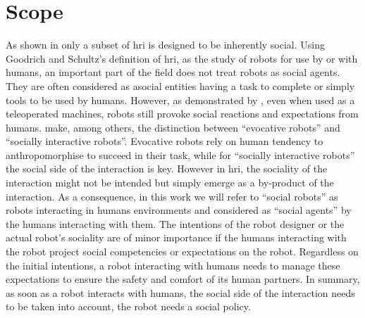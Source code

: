 
%
%
%

\section{Scope}\label{sec:intro_scope}

As shown in \cite{goodrich2007human} only a subset of \gls{hri} is designed to be inherently social. Using Goodrich and Schultz's definition of \gls{hri}, as the study of robots for use by or with humans, an important part of the field does not treat robots as social agents. They are often considered as asocial entities having a task to complete or simply tools to be used by humans. However, as demonstrated by \cite{fincannon2004evidence}, even when used as a teleoperated machines, robots still provoke social reactions and expectations from humans. \cite{fong2003survey} make, among others, the distinction between ``evocative robots'' and ``socially interactive robots''. Evocative robots rely on human tendency to anthropomorphise to succeed in their task, while for ``socially interactive robots'' the social side of the interaction is key. However in \gls{hri}, the sociality of the interaction might not be intended but simply emerge as a by-product of the interaction. As a consequence, in this work we will refer to ``social robots'' as robots interacting in humans environments and considered as ``social agents'' by the humans interacting with them. The intentions of the robot designer or the actual robot's sociality are of minor importance if the humans interacting with the robot project social competencies or expectations on the robot. Regardless on the initial intentions, a robot interacting with humans needs to manage these expectations to ensure the safety and comfort of its human partners. In summary, as soon as a robot interacts with humans, the social side of the interaction needs to be taken into account, the robot needs a social policy. 


